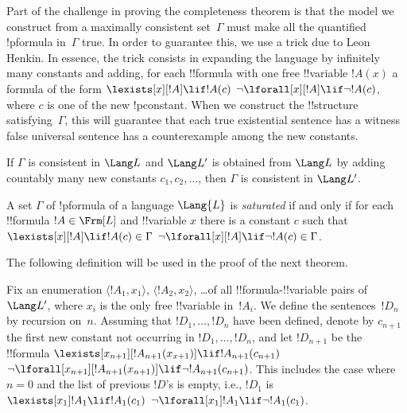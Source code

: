 \documentclass[../../include/open-logic-section]{subfiles}
\begin{document}
\begin{explain}
Part of the challenge in proving the completeness theorem is that the
model we construct from a maximally consistent set~$\Gamma$ must make
all the quantified !p{formula} in~$\Gamma$ true.  In order to
guarantee this, we use a trick due to Leon Henkin.  In essence, the
trick consists in expanding the language by infinitely many constants
and adding, for each !!{formula} with one free !!{variable} $!A(x)$ a
formula of the form 
      {$\lexists[x][!A] \lif !A(c)$}
      {$\lnot\lforall[x][!A] \lif \lnot !A(c)$},
where $c$ is one of the new !p{constant}.  When we construct the
!!{structure} satisfying~$\Gamma$, this will guarantee that each
{true existential sentence has a witness}
{false universal sentence has a counterexample}
among the new constants.
\end{explain}

\begin{lem}
If $\Gamma$ is consistent in $\Lang L$ and $\Lang L'$ is obtained from
$\Lang L$ by adding countably many new constants $c_1, c_2, \dots$,
then $\Gamma$ is consistent in $\Lang L'$.
\end{lem}

\begin{defn}
A set $\Gamma$ of !p{formula} of a language $\Lang {L}$ is
\emph{saturated} if and only if for each !!{formula} $!A \in \Frm[L]$
and !!{variable} $x$ there is a constant $c$ such that
      {$\lexists[x][!A] \lif !A(c) \in \Gamma$}
      {$\lnot\lforall[x][!A] \lif \lnot !A(c) \in \Gamma$}.
\end{defn}

The following definition will be used in the proof of the next theorem.

\begin{defn}
Fix an enumeration $\langle !A_1, x_1 \rangle$, $\langle !A_2, x_2
\rangle$, \dots of all !!{formula}-!!{variable} pairs of $\Lang L'$,
where $x_i$ is the only free !!{variable} in~$!A_i$.
We define the sentences~$!D_n$ by recursion on~$n$. Assuming that
$!D_1, \dots, !D_n$ have been defined, denote by $c_{n+1}$ the first
new constant not occurring in $!D_1, \dots, !D_n$, and let $!D_{n+1}$
be the !!{formula} 
{$\lexists[x_{n+1}][!A_{n+1}(x_{x+1})] \lif !A_{n+1}(c_{n+1})$}
{$\lnot\lforall[x_{n+1}][!A_{n+1}(x_{n+1})] \lif \lnot !A_{n+1}(c_{n+1})$}. 
This includes the case where $n = 0$ and the list of previous $!D$'s
is empty, i.e., $!D_1$ is
{$\lexists[x_1] !A_1 \lif !A_1(c_1)$}
{$\lnot\lforall[x_1] !A_1 \lif \lnot !A_1(c_1)$}.
\end{defn}
\end{document}

